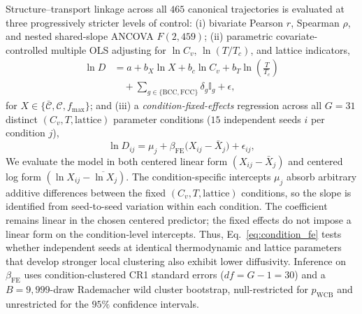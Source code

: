 \documentclass[aps,pre,reprint,superscriptaddress,amsmath,amssymb,floatfix]{revtex4-2}
\begin{document}
Structure--transport linkage across all $465$ canonical trajectories is evaluated at three progressively stricter levels of control: (i) bivariate Pearson $r$, Spearman $\rho$, and nested shared-slope ANCOVA $F(2,459)$; (ii) parametric covariate-controlled multiple OLS adjusting for $\ln C_v$, $\ln(T/T_c)$, and lattice indicators,
\begin{align}
  \ln D &= a + b_X \ln X + b_c \ln C_v + b_T \ln\!\left(\frac{T}{T_c}\right) \nonumber \\
        &\quad + \sum_{g \in \{\mathrm{BCC,FCC}\}} \delta_g \mathbb{I}_g + \epsilon,
  \label{eq:controlled_ols}
\end{align}
for $X \in \{\bar{\mathcal{C}}, \mathcal{C}, f_{\max}\}$; and (iii) a \emph{condition-fixed-effects} regression across all $G = 31$ distinct $(C_v, T, \text{lattice})$ parameter conditions ($15$ independent seeds $i$ per condition $j$),
\begin{equation}
  \ln D_{ij} = \mu_j + \beta_{\mathrm{FE}}\bigl(X_{ij} - \bar{X}_j\bigr) + \epsilon_{ij},
  \label{eq:condition_fe}
\end{equation}
We evaluate the model in both centered linear form $(X_{ij} - \bar{X}_j)$ and centered log form $(\ln X_{ij} - \overline{\ln X}_j)$. The condition-specific intercepts $\mu_j$ absorb arbitrary additive differences between the fixed $(C_v,T,\text{lattice})$ conditions, so the slope is identified from seed-to-seed variation within each condition. The coefficient remains linear in the chosen centered predictor; the fixed effects do not impose a linear form on the condition-level intercepts. Thus, Eq.~\eqref{eq:condition_fe} tests whether independent seeds at identical thermodynamic and lattice parameters that develop stronger local clustering also exhibit lower diffusivity. Inference on $\beta_{\mathrm{FE}}$ uses condition-clustered CR1 standard errors ($df=G-1=30$) and a $B=9{,}999$-draw Rademacher wild cluster bootstrap, null-restricted for $p_{\mathrm{WCB}}$ and unrestricted for the $95\%$ confidence intervals.
\end{document}
